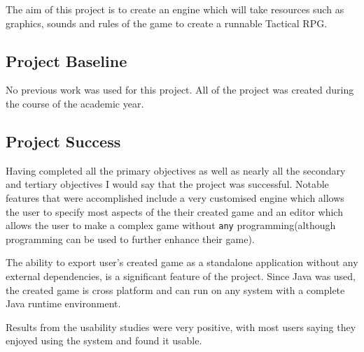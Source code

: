 The aim of this project is to create an engine which will take resources such as graphics, sounds and rules of the game to create a runnable Tactical RPG.

\subsection{Project Baseline}
\label{sub:baseline}

No previous work was used for this project. All of the project was created during the course of the academic year.

\subsection{Project Success}

Having completed all the primary objectives as well as nearly all the secondary and tertiary objectives I would say that the project was successful.  Notable features that were accomplished include a very customised engine which allows the user to specify most aspects of the their created game and an editor which allows the user to make a complex game without \texttt{any} programming(although programming can be used to further enhance their game). 

The ability to export user's created game as a standalone application without any external dependencies, is a significant feature of the project. Since Java was used, the created game is cross platform and can run on any system with  a complete Java runtime environment.  

Results from the usability studies were very positive, with most users saying they enjoyed using the system and found it usable. 
